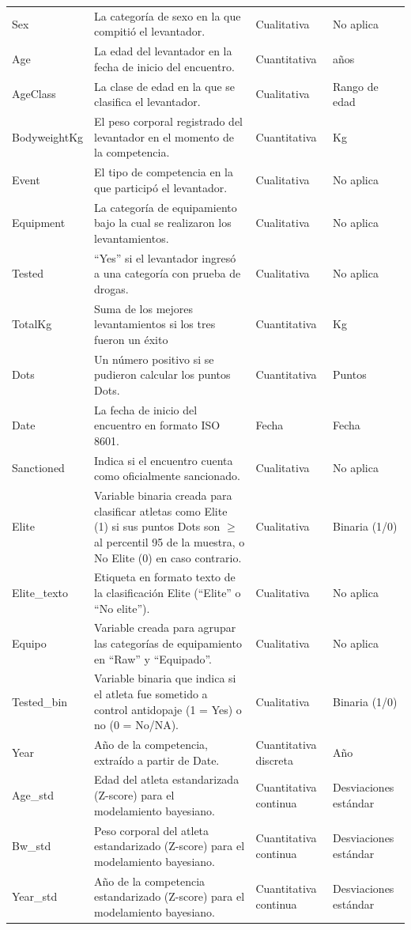 \documentclass[letter]{article}
\begin{document}
\begin{longtable}{lp{8cm}ll}
Sex & La categoría de sexo en la que compitió el levantador. & Cualitativa & No aplica \\
Age & La edad del levantador en la fecha de inicio del encuentro. & Cuantitativa & años \\
AgeClass & La clase de edad en la que se clasifica el levantador. & Cualitativa & Rango de edad \\
BodyweightKg & El peso corporal registrado del levantador en el momento de la competencia. & Cuantitativa & Kg \\
Event & El tipo de competencia en la que participó el levantador. & Cualitativa & No aplica \\
Equipment & La categoría de equipamiento bajo la cual se realizaron los levantamientos. & Cualitativa & No aplica \\
Tested & ``Yes'' si el levantador ingresó a una categoría con prueba de drogas. & Cualitativa & No aplica \\
TotalKg & Suma de los mejores levantamientos si los tres fueron un éxito & Cuantitativa & Kg \\
Dots & Un número positivo si se pudieron calcular los puntos Dots. & Cuantitativa & Puntos \\
Date & La fecha de inicio del encuentro en formato ISO 8601. & Fecha & Fecha \\
Sanctioned & Indica si el encuentro cuenta como oficialmente sancionado. & Cualitativa & No aplica \\
Elite & Variable binaria creada para clasificar atletas como Elite (1) si sus puntos Dots son $\geq$ al percentil 95 de la muestra, o No Elite (0) en caso contrario. & Cualitativa & Binaria (1/0) \\
Elite\_texto & Etiqueta en formato texto de la clasificación Elite (``Elite'' o ``No elite''). & Cualitativa & No aplica \\
Equipo & Variable creada para agrupar las categorías de equipamiento en ``Raw'' y ``Equipado''. & Cualitativa & No aplica \\
Tested\_bin & Variable binaria que indica si el atleta fue sometido a control antidopaje (1 = Yes) o no (0 = No/NA). & Cualitativa & Binaria (1/0) \\
Year & Año de la competencia, extraído a partir de Date. & Cuantitativa discreta & Año \\
Age\_std & Edad del atleta estandarizada (Z-score) para el modelamiento bayesiano. & Cuantitativa continua & Desviaciones estándar \\
Bw\_std & Peso corporal del atleta estandarizado (Z-score) para el modelamiento bayesiano. & Cuantitativa continua & Desviaciones estándar \\
Year\_std & Año de la competencia estandarizado (Z-score) para el modelamiento bayesiano. & Cuantitativa continua & Desviaciones estándar \\

\end{longtable}
\end{document}
